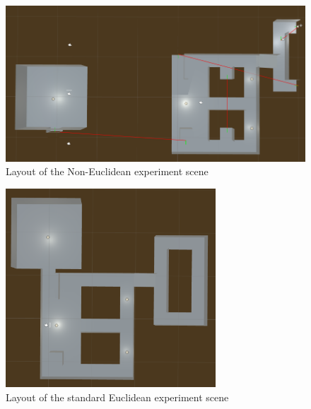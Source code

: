 \begin{figure}[h]
	\label{design:fig:design:ne}
	\includegraphics[width=1\textwidth]{Images/NE_Layout}
	\centering
	\caption{Layout of the Non-Euclidean experiment scene}
\end{figure}

\begin{figure}[h]
	\label{design:fig:design:standard}
	\includegraphics[width=0.7\textwidth]{Images/Standard_Layout}
	\centering
	\caption{Layout of the standard Euclidean experiment scene}
\end{figure}

